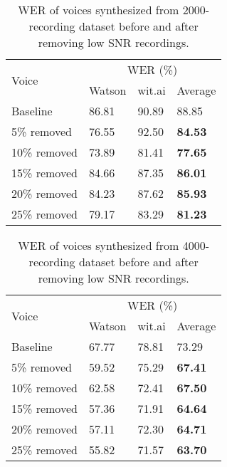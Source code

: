 \documentclass[12pt]{article}
\begin{document}
\begin{table}[]
\begin{center}
\caption{WER of voices synthesized from 2000-recording dataset before and after removing low SNR recordings.}
\label{tab_werSnr2000}
\vspace{3mm}
\begin{tabular}{|l|l|l|l|}
\hline
\multirow{2}{2.5cm}{Voice} &
\multicolumn{3}{c|}{WER (\%)} \\ \cline{2-4}
& Watson & wit.ai & Average \\
\hline
Baseline     & 86.81 & 90.89 & 88.85 \\
5\% removed  & 76.55 &	92.50 & \textbf{84.53} \\
10\% removed & 73.89 & 81.41 & \textbf{77.65} \\
15\% removed & 84.66 & 87.35 & \textbf{86.01} \\
20\% removed & 84.23 & 87.62 & \textbf{85.93} \\
25\% removed & 79.17 & 83.29 & \textbf{81.23} \\
\hline
\end{tabular}
\end{center}
\end{table}

\begin{table}[]
\begin{center}
\caption{WER of voices synthesized from 4000-recording dataset before and after removing low SNR recordings.}
\label{tab_werSnr4000}
\vspace{3mm}
\begin{tabular}{|l|l|l|l|}
\hline
\multirow{2}{2.5cm}{Voice} &
\multicolumn{3}{c|}{WER (\%)} \\ \cline{2-4}
& Watson & wit.ai & Average \\
\hline
Baseline     & 67.77 & 78.81 & 73.29 \\
5\% removed  & 59.52 & 75.29 & \textbf{67.41} \\
10\% removed & 62.58 & 72.41 & \textbf{67.50} \\
15\% removed & 57.36 & 71.91 & \textbf{64.64} \\
20\% removed & 57.11 & 72.30 & \textbf{64.71} \\
25\% removed & 55.82 & 71.57 & \textbf{63.70} \\
\hline
\end{tabular}
\end{center}
\end{table}
\end{document}
